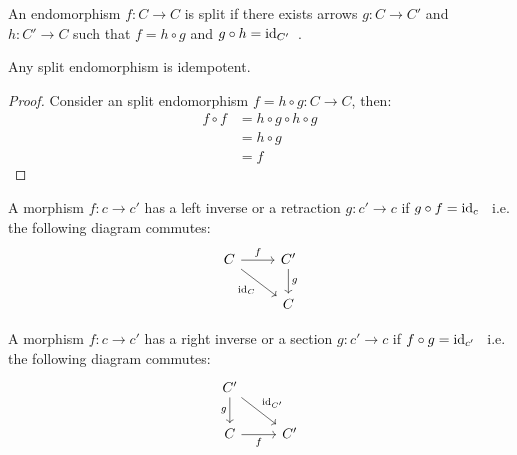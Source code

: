\begin{definition}
  An endomorphism $f:C\to C$ is split if there exists arrows $g:C\to C'$ and
  $h:C'\to C$ such that $f=h\circ g$ and $g\circ h=
  \mathrm{id}_{C'}$~\parencite[p.~20]{lane:working_mathematician}.
\end{definition}

\begin{theorem}
  Any split endomorphism is idempotent.

  \begin{proof}
    Consider an split endomorphism $f=h\circ g:C\to C$, then:
    \[
      \begin{aligned}
        f\circ f &= h\circ g \circ h\circ g\\
        &= h\circ g\\
        &= f
      \end{aligned}
    \]
  \end{proof}
\end{theorem}

\begin{definition}
  A morphism $f: c\to c'$ has a left inverse or a retraction $g: c'\to c$ if
  $g\circ f = \mathrm{id}_c$~\parencite[p.~19]{lane:working_mathematician} i.e. the
  following diagram commutes:
  \[\begin{tikzcd}[ampersand replacement=\&]
    C \& {C'} \\
    \& C
    \arrow["f", from=1-1, to=1-2]
    \arrow["g", from=1-2, to=2-2]
    \arrow["{\id_C}"', from=1-1, to=2-2]
  \end{tikzcd}\]
\end{definition}


\begin{definition}
  A morphism $f: c\to c'$ has a right inverse or a section $g: c'\to c$ if
  $f\circ g = \mathrm{id}_{c'}$~\parencite[p.~19]{lane:working_mathematician} i.e. the
  following diagram commutes:
  \[\begin{tikzcd}[ampersand replacement=\&]
    {C'} \\
    C \& {C'}
    \arrow["f"', from=2-1, to=2-2]
    \arrow["g"', from=1-1, to=2-1]
    \arrow["{\id_{C'}}", from=1-1, to=2-2]
  \end{tikzcd}\]
\end{definition}

